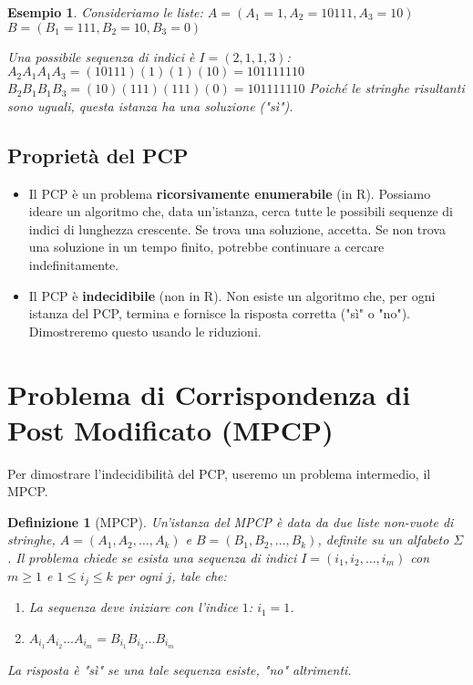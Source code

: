 \documentclass[a4paper, 11pt]{book} %
\newtheorem{definition}[theorem]{Definizione}
\newtheorem{example}[theorem]{Esempio}
\theoremstyle{definition}
\begin{document}
\begin{example}
Consideriamo le liste:
$A = (A_1 = 1, A_2 = 10111, A_3 = 10)$
$B = (B_1 = 111, B_2 = 10, B_3 = 0)$

Una possibile sequenza di indici è $I = (2, 1, 1, 3)$:
$A_2 A_1 A_1 A_3 = (10111)(1)(1)(10) = 101111110$
$B_2 B_1 B_1 B_3 = (10)(111)(111)(0) = 101111110$
Poiché le stringhe risultanti sono uguali, questa istanza ha una soluzione ("sì").
\end{example}

\subsection{Proprietà del PCP}
\begin{itemize}
    \item Il PCP è un problema \textbf{ricorsivamente enumerabile} (in R). Possiamo ideare un algoritmo che, data un'istanza, cerca tutte le possibili sequenze di indici di lunghezza crescente. Se trova una soluzione, accetta. Se non trova una soluzione in un tempo finito, potrebbe continuare a cercare indefinitamente.
    \item Il PCP è \textbf{indecidibile} (non in R). Non esiste un algoritmo che, per ogni istanza del PCP, termina e fornisce la risposta corretta ("sì" o "no"). Dimostreremo questo usando le riduzioni.
\end{itemize}

\section{Problema di Corrispondenza di Post Modificato (MPCP)}

Per dimostrare l'indecidibilità del PCP, useremo un problema intermedio, il MPCP.

\begin{definition}[MPCP]
Un'istanza del MPCP è data da due liste non-vuote di stringhe, $A = (A_1, A_2, \dots, A_k)$ e $B = (B_1, B_2, \dots, B_k)$, definite su un alfabeto $\Sigma$.
Il problema chiede se esista una sequenza di indici $I = (i_1, i_2, \dots, i_m)$ con $m \ge 1$ e $1 \le i_j \le k$ per ogni $j$, tale che:
\begin{enumerate}
    \item La sequenza deve iniziare con l'indice $1$: $i_1 = 1$.
    \item $A_{i_1} A_{i_2} \dots A_{i_m} = B_{i_1} B_{i_2} \dots B_{i_m}$
\end{enumerate}
La risposta è "sì" se una tale sequenza esiste, "no" altrimenti.
\end{definition}
\end{document}
